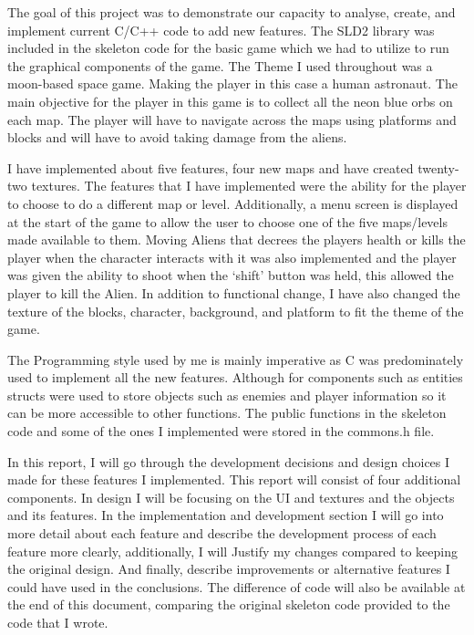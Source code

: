 The goal of this project was to demonstrate our capacity to analyse, create, and implement current C/C++ code to add new features. The SLD2 library was included in the skeleton code for the basic game which we had to utilize to run the graphical components of the game. The Theme I used throughout was a moon-based space game. Making the player in this case a human astronaut. The main objective for the player in this game is to collect all the neon blue orbs on each map. The player will have to navigate across the maps using platforms and blocks and will have to avoid taking damage from the aliens.

I have implemented about five features, four new maps and have created twenty-two textures. The features that I have implemented were the ability for the player to choose to do a different map or level. Additionally, a menu screen is displayed at the start of the game to allow the user to choose one of the five maps/levels made available to them. Moving Aliens that decrees the players health or kills the player when the character interacts with it was also implemented and the player was given the ability to shoot when the ‘shift’ button was held, this allowed the player to kill the Alien. In addition to functional change, I have also changed the texture of the blocks, character, background, and platform to fit the theme of the game.

The Programming style used by me is mainly imperative as C was predominately used to implement all the new features. Although for components such as entities structs were used to store objects such as enemies and player information so it can be more accessible to other functions. The public functions in the skeleton code and some of the ones I implemented were stored in the commons.h file. 

In this report, I will go through the development decisions and design choices I made for these features I implemented. This report will consist of four additional components. In design I will be focusing on the UI and textures and the objects and its features. In the implementation and development section I will go into more detail about each feature and describe the development process of each feature more clearly, additionally, I will Justify my changes compared to keeping the original design. And finally, describe improvements or alternative features I could have used in the conclusions. The difference of code will also be available at the end of this document, comparing the original skeleton code provided to the code that I wrote.
